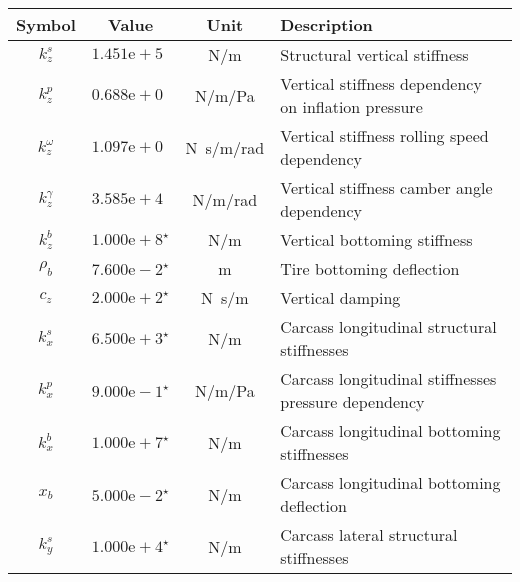 \begin{longtable}{cccl}
%
\toprule
\textbf{Symbol} & \textbf{Value} & \textbf{Unit} & \textbf{Description} \\
\midrule
$k_z^s$            & $1.451\mathrm{e+}5\phantom{^\star}$ & \unit[per-mode=symbol]{\newton\per\meter}                   & Structural vertical stiffness \\
$k_z^p$            & $0.688\mathrm{e+}0\phantom{^\star}$ & \unit[per-mode=symbol]{\newton\per\meter\per\pascal}        & Vertical stiffness dependency on inflation pressure \\
$k_z^\omega$       & $1.097\mathrm{e+}0\phantom{^\star}$ & \unit[per-mode=symbol]{\newton\second\per\meter\per\radian} & Vertical stiffness rolling speed dependency \\
$k_z^\gamma$       & $3.585\mathrm{e+}4\phantom{^\star}$ & \unit[per-mode=symbol]{\newton\per\meter\per\radian}        & Vertical stiffness camber angle dependency \\
$k_z^b$            & $1.000\mathrm{e+}8^\star$           & \unit[per-mode=symbol]{\newton\per\meter}                   & Vertical bottoming stiffness \\
$\rho_b$           & $7.600\mathrm{e-}2^\star$           & \unit[per-mode=symbol]{\meter}                              & Tire bottoming deflection \\
$c_z$              & $2.000\mathrm{e+}2^\star$           & \unit[per-mode=symbol]{\newton\second\per\meter}            & Vertical damping \\
$k_x^s$            & $6.500\mathrm{e+}3^\star$           & \unit[per-mode=symbol]{\newton\per\meter}                   & Carcass longitudinal structural stiffnesses \\
$k_x^p$            & $9.000\mathrm{e-}1^\star$           & \unit[per-mode=symbol]{\newton\per\meter\per\pascal}        & Carcass longitudinal stiffnesses pressure dependency \\
$k_x^b$            & $1.000\mathrm{e+}7^\star$           & \unit[per-mode=symbol]{\newton\per\meter}                   & Carcass longitudinal bottoming stiffnesses \\
$x_b$              & $5.000\mathrm{e-}2^\star$           & \unit[per-mode=symbol]{\newton\per\meter}                   & Carcass longitudinal bottoming deflection \\
$k_y^s$            & $1.000\mathrm{e+}4^\star$           & \unit[per-mode=symbol]{\newton\per\meter}                   & Carcass lateral structural stiffnesses \\

\end{longtable}
